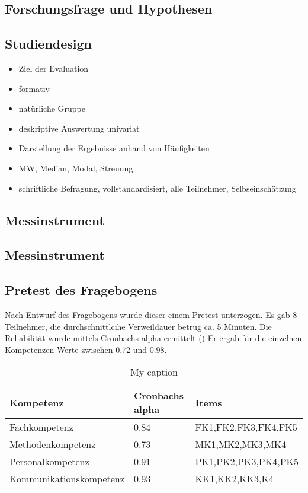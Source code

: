 \documentclass[12pt, bibliography=totoc]{scrartcl}
\begin{document}
\subsection{Forschungsfrage und
Hypothesen}\label{forschungsfrage-und-hypothesen}

\subsection{Studiendesign}\label{studiendesign}

\begin{itemize}
\tightlist
\item
  Ziel der Evaluation
\item
  formativ
\item
  natürliche Gruppe
\item
  deskriptive Auswertung univariat
\item
  Darstellung der Ergebnisse anhand von Häufigkeiten
\item
  MW, Median, Modal, Streuung
\item
  schriftliche Befragung, vollstandardisiert, alle Teilnehmer,
  Selbseinschätzung
\end{itemize}

\subsection{Messinstrument}\label{messinstrument}

\subsection{Messinstrument}\label{messinstrument-1}

\subsection{Pretest des Fragebogens}\label{pretest-des-fragebogens}

Nach Entwurf des Fragebogens wurde dieser einem Pretest unterzogen. Es
gab 8 Teilnehmer, die durchschnittlcihe Verweildauer betrug ca. 5
Minuten. Die Reliabilität wurde mittels Cronbachs alpha ermittelt
(\textcite{Wassa}) Er ergab für die einzelnen Kompetenzen Werte zwischen
0.72 und 0.98.

\begin{table}[]
\centering
\caption{My caption}
\label{my-label}
\begin{tabular}{@{}lll@{}}
\toprule
Kompetenz               & Cronbachs alpha & Items               \\ \midrule
Fachkompetenz           & 0.84            & FK1,FK2,FK3,FK4,FK5 \\
Methodenkompetenz       & 0.73            & MK1,MK2,MK3,MK4     \\
Personalkompetenz       & 0.91            & PK1,PK2,PK3,PK4,PK5 \\
Kommunikationskompetenz & 0.93            & KK1,KK2,KK3,K4      \\ \bottomrule
\end{tabular}
\end{table}
\end{document}
